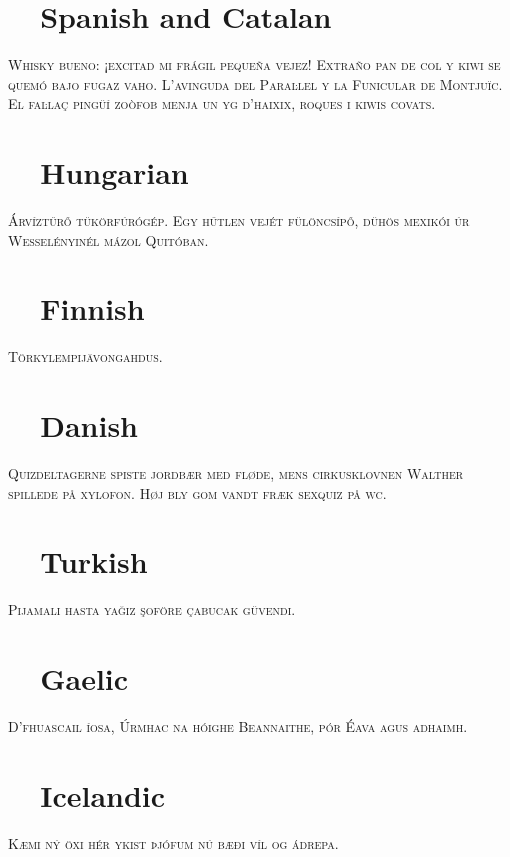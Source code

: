 \documentclass{article}
\def\checkno	{\textcolor{red}{\textbf{\ding{55}~~}}}
\def\checkyes	{\textcolor{green}{\textbf{\ding{51}~~}}}
\begin{document}
\vspace{-1em}\section*{\checkyes Spanish and Catalan}
\noindent\textsc{
Whisky bueno: ¡excitad mi frágil pequeña vejez!
Extraño pan de col y kiwi se quemó bajo fugaz vaho. 
L'avinguda del Paraŀlel y la Funicular de Montjuïc.
El faŀlaç pingüí zoòfob menja un yg d'haixix, roques i kiwis covats.
}

\vspace{-1em}\section*{\checkyes Hungarian}
\noindent\textsc{
Árvíztűrő tükörfúrógép.
Egy hűtlen vejét fülöncsípő, dühös mexikói úr Wesselényinél mázol Quitóban.
}

\vspace{-1em}\section*{\checkno Finnish}
\noindent\textsc{
Törkylempijävongahdus.
}

\vspace{-1em}\section*{\checkno Danish}
\noindent\textsc{
Quizdeltagerne spiste jordbær med fløde, 
mens cirkusklovnen Walther spillede på xylofon. 
Høj bly gom vandt fræk sexquiz på wc.
}

\vspace{-1em}\section*{\checkno Turkish}
\noindent\textsc{
Pijamalı hasta yağız şoföre çabucak güvendi.
}

\vspace{-1em}\section*{\checkno Gaelic}
\noindent\textsc{
D'fhuascail íosa, Úrmhac na hóighe Beannaithe, pór Éava agus adhaimh.
}

\vspace{-1em}\section*{\checkno Icelandic}
\noindent\textsc{
Kæmi ný öxi hér ykist þjófum nú bæði víl og ádrepa.
}
\end{document}
